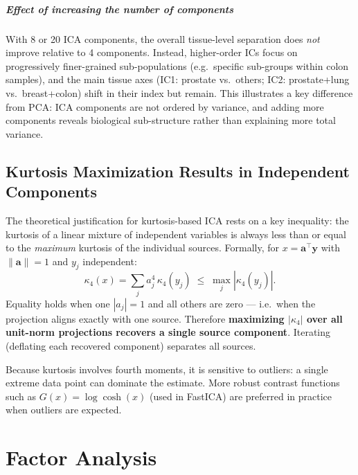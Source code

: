\documentclass[11pt, oneside]{book}
\newcommand{\T}{^{\top}}
\begin{document}
\paragraph{Effect of increasing the number of components}
With 8 or 20 ICA components, the overall tissue-level separation does \emph{not}
improve relative to 4 components.
Instead, higher-order ICs focus on progressively finer-grained sub-populations
(e.g.\ specific sub-groups within colon samples), and the main tissue axes
(IC1: prostate vs.\ others; IC2: prostate+lung vs.\ breast+colon) shift in
their index but remain.
This illustrates a key difference from PCA: ICA components are not ordered
by variance, and adding more components reveals biological sub-structure rather
than explaining more total variance.


\section{Kurtosis Maximization Results in Independent Components}

The theoretical justification for kurtosis-based ICA rests on a key inequality:
the kurtosis of a linear mixture of independent variables is always less than or equal
to the \emph{maximum} kurtosis of the individual sources.
Formally, for $x = \bm{a}\T\bm{y}$ with $\|\bm{a}\| = 1$ and $y_j$ independent:
\[
  \kappa_4(x) = \sum_j a_j^4\,\kappa_4(y_j) \;\leq\; \max_j |\kappa_4(y_j)|.
\]
Equality holds when one $|a_j| = 1$ and all others are zero --- i.e.\ when the
projection aligns exactly with one source.
Therefore \textbf{maximizing $|\kappa_4|$ over all unit-norm projections recovers a
single source component}.
Iterating (deflating each recovered component) separates all sources.

\begin{notebox}[title={Limitations of kurtosis}]
Because kurtosis involves fourth moments, it is sensitive to outliers: a single
extreme data point can dominate the estimate.
More robust contrast functions such as $G(x) = \log\cosh(x)$ (used in FastICA) are
preferred in practice when outliers are expected.
\end{notebox}


\chapter{Factor Analysis}
\end{document}
